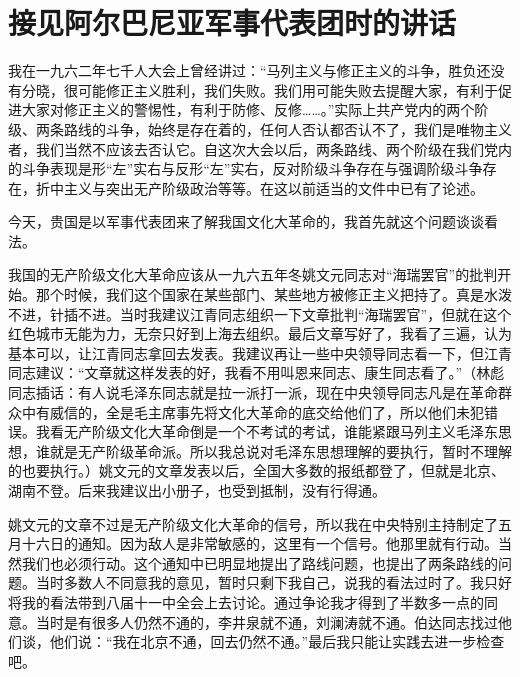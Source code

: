 \section[接见阿尔巴尼亚军事代表团时的讲话（一九六七年五月）]{接见阿尔巴尼亚军事代表团时的讲话}


我在一九六二年七千人大会上曾经讲过：“马列主义与修正主义的斗争，胜负还没有分晓，很可能修正主义胜利，我们失败。我们用可能失败去提醒大家，有利于促进大家对修正主义的警惕性，有利于防修、反修……。”实际上共产党内的两个阶级、两条路线的斗争，始终是存在着的，任何人否认都否认不了，我们是唯物主义者，我们当然不应该去否认它。自这次大会以后，两条路线、两个阶级在我们党内的斗争表现是形“左”实右与反形“左”实右，反对阶级斗争存在与强调阶级斗争存在，折中主义与突出无产阶级政治等等。在这以前适当的文件中已有了论述。

今天，贵国是以军事代表团来了解我国文化大革命的，我首先就这个问题谈谈看法。

我国的无产阶级文化大革命应该从一九六五年冬姚文元同志对“海瑞罢官”的批判开始。那个时候，我们这个国家在某些部门、某些地方被修正主义把持了。真是水泼不进，针插不进。当时我建议江青同志组织一下文章批判“海瑞罢官”，但就在这个红色城市无能为力，无奈只好到上海去组织。最后文章写好了，我看了三遍，认为基本可以，让江青同志拿回去发表。我建议再让一些中央领导同志看一下，但江青同志建议：“文章就这样发表的好，我看不用叫恩来同志、康生同志看了。”（林彪同志插话：有人说毛泽东同志就是拉一派打一派，现在中央领导同志凡是在革命群众中有威信的，全是毛主席事先将文化大革命的底交给他们了，所以他们未犯错误。我看无产阶级文化大革命倒是一个不考试的考试，谁能紧跟马列主义毛泽东思想，谁就是无产阶级革命派。所以我总说对毛泽东思想理解的要执行，暂时不理解的也要执行。）姚文元的文章发表以后，全国大多数的报纸都登了，但就是北京、湖南不登。后来我建议出小册子，也受到抵制，没有行得通。

姚文元的文章不过是无产阶级文化大革命的信号，所以我在中央特别主持制定了五月十六日的通知。因为敌人是非常敏感的，这里有一个信号。他那里就有行动。当然我们也必须行动。这个通知中已明显地提出了路线问题，也提出了两条路线的问题。当时多数人不同意我的意见，暂时只剩下我自己，说我的看法过时了。我只好将我的看法带到八届十一中全会上去讨论。通过争论我才得到了半数多一点的同意。当时是有很多人仍然不通的，李井泉就不通，刘澜涛就不通。伯达同志找过他们谈，他们说：“我在北京不通，回去仍然不通。”最后我只能让实践去进一步检查吧。


